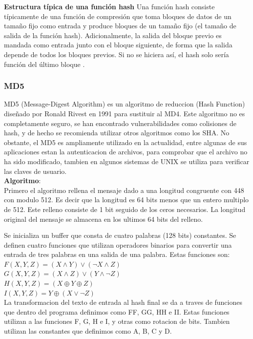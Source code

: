 \documentclass[spanish]{article}
\begin{document}
\textbf{Estructura típica de una función hash}
Una función hash consiste típicamente de una función de compresión que toma bloques de datos de un tamaño fijo como entrada y produce bloques de un tamaño fijo (el tamaño de salida de la función hash). Adicionalmente, la salida del bloque previo es mandada como entrada junto con el bloque siguiente, de forma que la salida depende de todos los bloques previos. Si no se hiciera así, el hash solo sería función del último bloque  .

\subsubsection{MD5}

MD5 (Message-Digest Algorithm) es un algoritmo de reduccion (Hash Function) diseñado por Ronald Rivest en 1991 para sustituir al MD4.
Este algoritmo no es completamente seguro, se han encontrado vulnerabilidades como colisiones de hash, y de hecho se recomienda utilizar otros algoritmos como los SHA. No obstante, el MD5 es ampliamente utilizado en la actualidad, entre algunas de sus aplicaciones estan la autenticacion de archivos, para comprobar que el archivo no ha sido modificado, tambien en algunos sistemas de UNIX se utiliza para verificar las claves de usuario.\\

\textbf{Algoritmo}:\\

Primero el algoritmo rellena el mensaje dado a una longitud congruente con 448 con modulo 512. Es decir que la longitud es 64 bits menos que un entero multiplo de 512. Este relleno consiste de 1 bit seguido de los ceros necesarios.
La longitud original del mensaje se almacena en los ultimos 64 bits del relleno.

Se inicializa un buffer que consta de cuatro palabras (128 bits) constantes.
Se definen cuatro funciones que utilizan operadores binarios para convertir una entrada de tres palabras en una salida de una palabra. Estas funciones son:
$F(X,Y,Z) = (X \wedge Y) \vee (\neg X \wedge Z)$\\
$G(X,Y,Z) = (X \wedge Z) \vee (Y \wedge \neg Z)$\\
$H(X,Y,Z) = (X \oplus Y \oplus Z)$\\
$I(X,Y,Z) = Y \oplus (X \vee \neg Z)$\\

La transformacion del texto de entrada al hash final se da a traves de funciones que dentro del programa definimos como FF, GG, HH e II. Estas funciones utilizan a las funciones F, G, H e I, y otras como rotacion de bits. Tambien utilizan las constantes que definimos como A, B, C y D.
\end{document}
